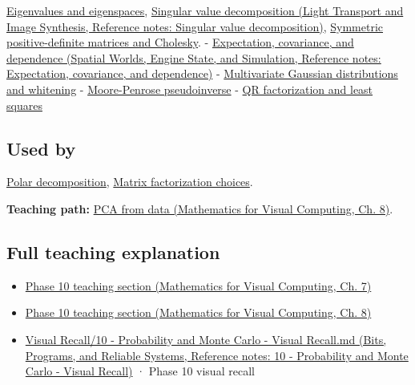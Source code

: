 \hypertarget{appendix-ad175ef3c5bf-prerequisites}{}

\hyperref[appendix-0b3be18411f9]{Eigenvalues and eigenspaces}, \href{../04-Light-Transport-and-Image-Synthesis/main.pdf\#nameddest=appendix-1fad5e7f36fa}{Singular value decomposition (Light Transport and Image Synthesis, Reference notes: Singular value decomposition)}, \hyperref[appendix-50d2ea3c9b26]{Symmetric positive-definite matrices and Cholesky}. - \href{../05-Spatial-Worlds-Engine-State-and-Simulation/main.pdf\#nameddest=appendix-54c383df9992}{Expectation, covariance, and dependence (Spatial Worlds, Engine State, and Simulation, Reference notes: Expectation, covariance, and dependence)} - \hyperref[appendix-12bbe185dbe5]{Multivariate Gaussian distributions and whitening} - \hyperref[appendix-541306fdbc1b]{Moore-Penrose pseudoinverse} - \hyperref[appendix-c3421e6b4f2c]{QR factorization and least squares}

\subsection{Used by}\label{appendix-ad175ef3c5bf-used-by}

\hypertarget{appendix-ad175ef3c5bf-used-by}{}

\hyperref[appendix-73f5bcf7a462]{Polar decomposition}, \hyperref[appendix-221a483bec2d]{Matrix factorization choices}.

\textbf{Teaching path:} \href{../02-Mathematics-for-Visual-Computing/main.pdf\#nameddest=02-foundations-ii-ch024-pca-turns-a-cloud-of-points-into-measured-variation}{PCA from data (Mathematics for Visual Computing, Ch. 8)}.

\subsection{Full teaching explanation}\label{appendix-ad175ef3c5bf-full-teaching-explanation}

\hypertarget{appendix-ad175ef3c5bf-full-teaching-explanation}{}

\begin{itemize}
\tightlist
\item
  \href{../02-Mathematics-for-Visual-Computing/main.pdf\#nameddest=02-foundations-ii-ch023-expected-values-describe-centers-covariance-describes-dependence}{Phase 10 teaching section (Mathematics for Visual Computing, Ch. 7)}
\item
  \href{../02-Mathematics-for-Visual-Computing/main.pdf\#nameddest=02-foundations-ii-ch024-waiting-times-event-counts-and-covariance-geometry}{Phase 10 teaching section (Mathematics for Visual Computing, Ch. 8)}
\item
  \href{../01-Bits-Programs-and-Reliable-Systems/main.pdf\#nameddest=appendix-cb5af353ef77}{Visual Recall/10 - Probability and Monte Carlo - Visual Recall.md (Bits, Programs, and Reliable Systems, Reference notes: 10 - Probability and Monte Carlo - Visual Recall)} · Phase 10 visual recall
\end{itemize}

